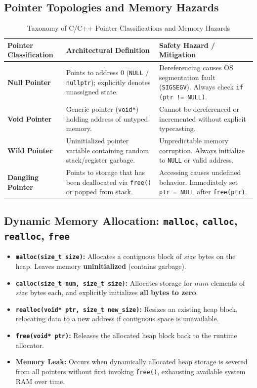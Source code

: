 \subsection{Pointer Topologies and Memory Hazards}
\begin{table}[htbp]
\centering
\small
\begin{tabularx}{\textwidth}{l X X}
\toprule
\textbf{Pointer Classification} & \textbf{Architectural Definition} & \textbf{Safety Hazard / Mitigation} \\
\midrule
\textbf{Null Pointer} & Points to address $0$ (\texttt{NULL} / \texttt{nullptr}); explicitly denotes unassigned state. & Dereferencing causes OS segmentation fault (\texttt{SIGSEGV}). Always check \texttt{if (ptr != NULL)}. \\
\textbf{Void Pointer} & Generic pointer (\texttt{void*}) holding address of untyped memory. & Cannot be dereferenced or incremented without explicit typecasting. \\
\textbf{Wild Pointer} & Uninitialized pointer variable containing random stack/register garbage. & Unpredictable memory corruption. Always initialize to \texttt{NULL} or valid address. \\
\textbf{Dangling Pointer} & Points to storage that has been deallocated via \texttt{free()} or popped from stack. & Accessing causes undefined behavior. Immediately set \texttt{ptr = NULL} after \texttt{free(ptr)}. \\
\bottomrule
\end{tabularx}
\caption{Taxonomy of C/C++ Pointer Classifications and Memory Hazards}
\label{tab:pointer_hazards}
\end{table}

\subsection{Dynamic Memory Allocation: \texttt{malloc}, \texttt{calloc}, \texttt{realloc}, \texttt{free}}
\begin{itemize}[leftmargin=*]
    \item \textbf{\texttt{malloc(size\_t size)}:} Allocates a contiguous block of $size$ bytes on the heap. Leaves memory \textbf{uninitialized} (contains garbage).
    \item \textbf{\texttt{calloc(size\_t num, size\_t size)}:} Allocates storage for $num$ elements of $size$ bytes each, and explicitly initializes \textbf{all bytes to zero}.
    \item \textbf{\texttt{realloc(void* ptr, size\_t new\_size)}:} Resizes an existing heap block, relocating data to a new address if contiguous space is unavailable.
    \item \textbf{\texttt{free(void* ptr)}:} Releases the allocated heap block back to the runtime allocator.
    \item \textbf{Memory Leak:} Occurs when dynamically allocated heap storage is severed from all pointers without first invoking \texttt{free()}, exhausting available system RAM over time.
\end{itemize}

